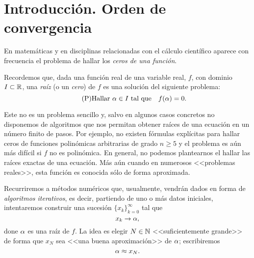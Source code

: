 
\section{Introducción. Orden de convergencia}
\label{sec:intro-orden-convergencia}

En matemáticas y en disciplinas relacionadas con el cálculo científico
aparece con frecuencia el problema de hallar los \textit{ceros de una
  función}.
\begin{center}
\end{center}

Recordemos que, dada una función real de una variable real, $f$, con
dominio $I\subset\operatorname{{\mathbb R}}$, una \textit{raíz} (o un \textit{cero}) de $f$
es una solución del siguiente problema:
\begin{equation}
  \label{eq:raiz}
  \tag{P}
  \text{Hallar $\alpha\in I$ tal que} \quad f(\alpha)=0.
\end{equation}


Este no es un problema sencillo y, salvo en algunos casos concretos no
disponemos de algoritmos que nos permitan obtener raíces de una
ecuación en un número finito de pasos. Por ejemplo, no existen
fórmulas explícitas para hallar ceros de funciones polinómicas
arbitrarias de grado $n\ge 5$ y el problema es aún más difícil si $f$
no es polinómica. En general, no podemos plantearnos el hallar las
raíces exactas de una ecuación. Más aún cuando en numerosos <<problemas
reales>>, esta función es conocida sólo de forma aproximada.

Recurriremos a métodos numéricos que, usualmente, vendrán dados en
forma de \textit{algoritmos iterativos}, es decir, partiendo de uno o
más datos iniciales, intentaremos construir una sucesión
$\{x_k\}_{k=0}^{\infty}$ tal que
$$
x_k \to \alpha,
$$
done $\alpha$ es una raíz de $f$. La idea es elegir $N\in\operatorname{{\mathbb N}}$
<<suficientemente grande>> de forma que $x_N$ sea <<una buena
aproximación>> de $\alpha$; escribiremos
$$
\alpha\approx x_N.
$$

